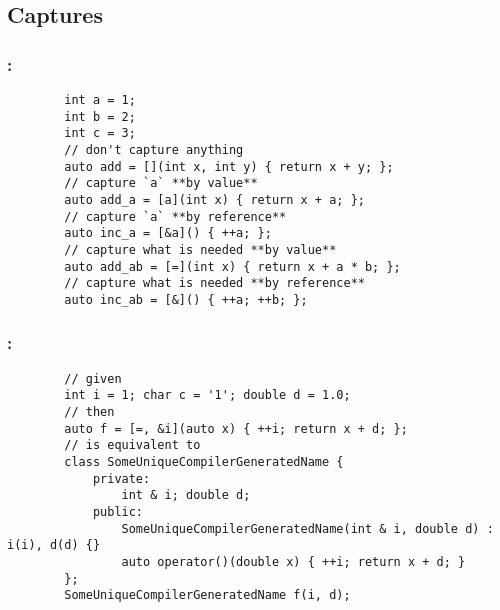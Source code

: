 \documentclass[aspectratio=43, t]{beamer}
\begin{document}
\subsection*{Captures}
\begin{frame}[fragile]
	\frametitle{\secname: \subsecname\footnotemark[1]{}}

	\begin{verbatim}
		int a = 1;
		int b = 2;
		int c = 3;
		// don't capture anything
		auto add = [](int x, int y) { return x + y; };
		// capture `a` **by value**
		auto add_a = [a](int x) { return x + a; };
		// capture `a` **by reference**
		auto inc_a = [&a]() { ++a; };
		// capture what is needed **by value**
		auto add_ab = [=](int x) { return x + a * b; };
		// capture what is needed **by reference**
		auto inc_ab = [&]() { ++a; ++b; };
	\end{verbatim}
\end{frame}

\begin{frame}[fragile]
	\frametitle{\secname: \subsecname}

	\begin{verbatim}
		// given
		int i = 1; char c = '1'; double d = 1.0;
		// then
		auto f = [=, &i](auto x) { ++i; return x + d; };
		// is equivalent to
		class SomeUniqueCompilerGeneratedName {
			private:
				int & i; double d;
			public:
				SomeUniqueCompilerGeneratedName(int & i, double d) : i(i), d(d) {}
				auto operator()(double x) { ++i; return x + d; }
		};
		SomeUniqueCompilerGeneratedName f(i, d);
	\end{verbatim}
\end{frame}
\end{document}
